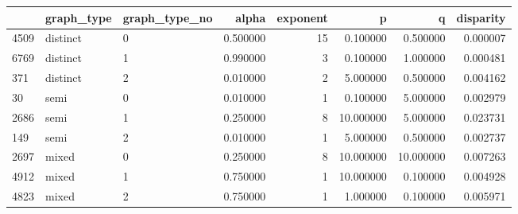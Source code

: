 \begin{tabular}{lllrrrrr}
\toprule
 & graph_type & graph_type_no & alpha & exponent & p & q & disparity \\
\midrule
4509 & distinct & 0 & 0.500000 & 15 & 0.100000 & 0.500000 & 0.000007 \\
6769 & distinct & 1 & 0.990000 & 3 & 0.100000 & 1.000000 & 0.000481 \\
371 & distinct & 2 & 0.010000 & 2 & 5.000000 & 0.500000 & 0.004162 \\
30 & semi & 0 & 0.010000 & 1 & 0.100000 & 5.000000 & 0.002979 \\
2686 & semi & 1 & 0.250000 & 8 & 10.000000 & 5.000000 & 0.023731 \\
149 & semi & 2 & 0.010000 & 1 & 5.000000 & 0.500000 & 0.002737 \\
2697 & mixed & 0 & 0.250000 & 8 & 10.000000 & 10.000000 & 0.007263 \\
4912 & mixed & 1 & 0.750000 & 1 & 10.000000 & 0.100000 & 0.004928 \\
4823 & mixed & 2 & 0.750000 & 1 & 1.000000 & 0.100000 & 0.005971 \\
\bottomrule
\end{tabular}
